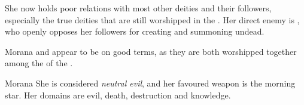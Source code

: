 She now holds poor relations with most other deities and their followers,
especially the true deities that are still worshipped in the
. Her direct enemy is , who openly
opposes her followers for creating and summoning undead.

Morana and  appear to be on good terms, as they are both
worshipped together among the  of the .

\begin{35e}{Morana}
  She is considered \emph{neutral evil}, and her favoured weapon is the
  morning star. Her domains are evil, death, destruction and knowledge.
\end{35e}
